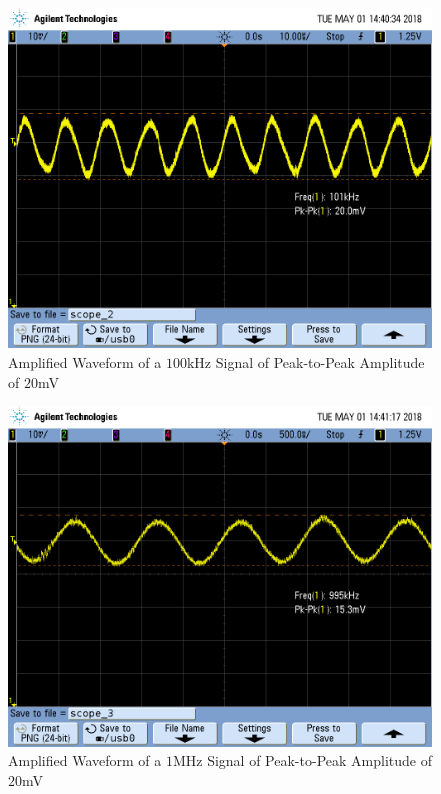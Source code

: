 \FloatBarrier

\begin{figure}[h!]
	\centering
	\includegraphics[scale=0.45]{./images/SCOPE_2.PNG}
	\caption{Amplified Waveform of a $100$\si{\kilo\hertz} Signal of Peak-to-Peak Amplitude of $20$\si{\milli\volt}}
	\label{fig:SCOPE_2}
\end{figure}

\FloatBarrier

\begin{figure}[h!]
	\centering
	\includegraphics[scale=0.45]{./images/SCOPE_3.PNG}
	\caption{Amplified Waveform of a $1$\si{\mega\hertz} Signal of Peak-to-Peak Amplitude of $20$\si{\milli\volt}}
	\label{fig:SCOPE_3}
\end{figure}

